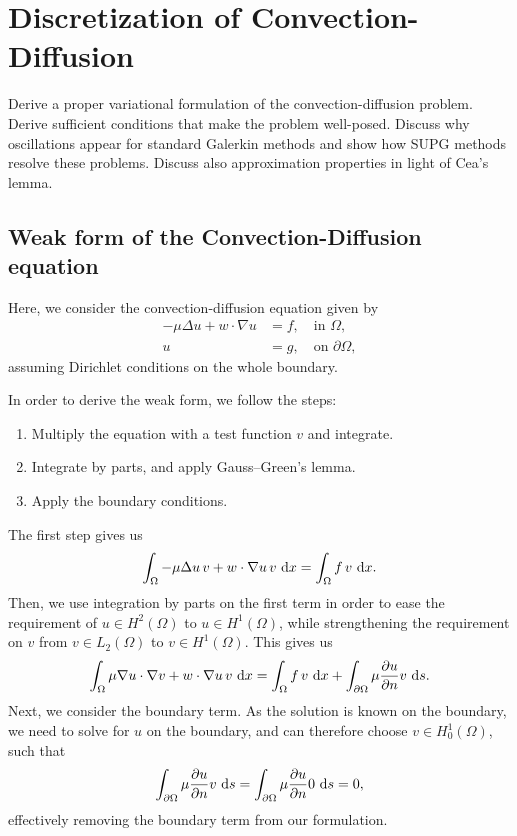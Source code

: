 \section{Discretization of Convection-Diffusion}
Derive a proper variational formulation of the convection-diffusion problem.
Derive sufficient conditions that make the problem well-posed.
Discuss why oscillations appear for standard Galerkin methods and show how SUPG methods resolve these problems.
Discuss also approximation properties in light of Cea's lemma.

\subsection{Weak form of the Convection-Diffusion equation}
Here, we consider the convection-diffusion equation given by
\begin{equation}
    \begin{split}
        -\mu \Delta u + w \cdot \nabla u &= f, \quad \text{in } \Omega,\\
        u &= g, \quad \text{on } \partial\Omega,
    \end{split}
\end{equation}
assuming Dirichlet conditions on the whole boundary.

In order to derive the weak form, we follow the steps:
\begin{enumerate}
    \item Multiply the equation with a test function $v$ and integrate.

    \item Integrate by parts, and apply Gauss--Green's lemma. %

    \item Apply the boundary conditions.
\end{enumerate}
The first step gives us
\begin{equation}
    \int_\Omega -\mu \Delta u \, v + w \cdot \nabla u \, v \, \mathop{}\!\mathrm{d} x = \int_\Omega f \, v \, \mathop{}\!\mathrm{d} x.
\end{equation}
Then, we use integration by parts on the first term in order to ease the requirement of $u \in H^2(\Omega)$ to $u \in H^1(\Omega)$, while strengthening the requirement on $v$ from $v \in L_2(\Omega)$ to $v \in H^1(\Omega)$.
This gives us
\begin{equation}
    \int_{\Omega} \mu \nabla u \cdot \nabla v  + w \cdot \nabla u \, v \, \mathop{}\!\mathrm{d} x = \int_{\Omega} f \, v \, \mathop{}\!\mathrm{d} x + \int_{\partial\Omega} \mu \frac{\partial u}{\partial n} v \, \mathop{}\!\mathrm{d} s.
\end{equation}
Next, we consider the boundary term.
As the solution is known on the boundary, we need to solve for $u$ on the boundary, and can therefore choose $v \in H_0^1(\Omega)$, such that
\begin{equation}
    \int_{\partial\Omega} \mu \frac{\partial u}{\partial n} v \, \mathop{}\!\mathrm{d} s
    = \int_{\partial\Omega} \mu \frac{\partial u}{\partial n} 0 \, \mathop{}\!\mathrm{d} s = 0,
\end{equation}
effectively removing the boundary term from our formulation.


